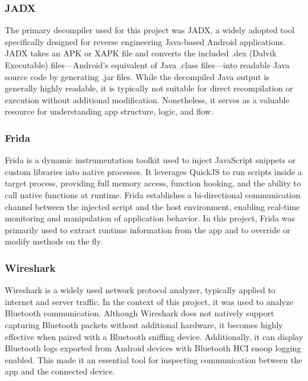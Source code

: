 \subsubsection{JADX}
The primary decompiler used for this project was JADX, a widely adopted tool specifically designed for reverse engineering Java-based Android applications. JADX takes an APK or XAPK file and converts the included .dex (Dalvik Executable) files—Android’s equivalent of Java .class files—into readable Java source code by generating .jar files. While the decompiled Java output is generally highly readable, it is typically not suitable for direct recompilation or execution without additional modification. Nonetheless, it serves as a valuable resource for understanding app structure, logic, and flow.

\subsubsection{Frida}
Frida is a dynamic instrumentation toolkit used to inject JavaScript snippets or custom libraries into native processes. It leverages QuickJS to run scripts inside a target process, providing full memory access, function hooking, and the ability to call native functions at runtime. Frida establishes a bi-directional communication channel between the injected script and the host environment, enabling real-time monitoring and manipulation of application behavior. In this project, Frida was primarily used to extract runtime information from the app and to override or modify methods on the fly.

\subsubsection{Wireshark}
Wireshark is a widely used network protocol analyzer, typically applied to internet and server traffic. In the context of this project, it was used to analyze Bluetooth communication. Although Wireshark does not natively support capturing Bluetooth packets without additional hardware, it becomes highly effective when paired with a Bluetooth sniffing device. Additionally, it can display Bluetooth logs exported from Android devices with Bluetooth HCI snoop logging enabled. This made it an essential tool for inspecting communication between the app and the connected device.

